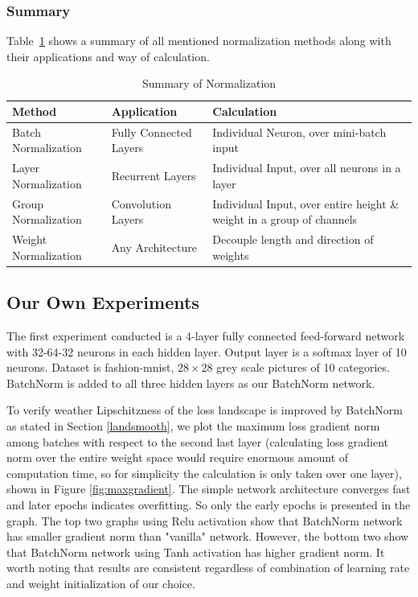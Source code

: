 \documentclass{article}
\begin{document}
\subsubsection{Summary}
Table~\ref{normsum} shows a summary of all mentioned normalization methods along with their applications and way of calculation.\\

\begingroup
\setlength{\tabcolsep}{10pt} %
\renewcommand{\arraystretch}{1.5} %
\begin{table}[h] 
\centering
 \begin{tabular}{|m{10em} | m{10em} | m{10em}|} 
 \hline
 Method & Application & Calculation\\  
 \hline
 Batch Normalization & Fully Connected Layers & Individual Neuron, over mini-batch input\\ [0.5ex] 
 \hline
 Layer Normalization & Recurrent Layers & Individual Input, over all neurons in a layer\\ [0.5ex]
 \hline
 Group Normalization & Convolution Layers & Individual Input, over entire height \& weight in a group of channels\\[0.5ex]
 \hline
 Weight Normalization & Any Architecture & Decouple length and direction of weights\\
 \hline
\end{tabular}
\caption{Summary of Normalization}
\label{normsum}
\end{table}
\endgroup

\subsection{Our Own Experiments}
The first experiment conducted is a 4-layer fully connected feed-forward network with 32-64-32 neurons in each hidden layer. Output layer is a softmax layer of 10 neurons. Dataset is fashion-mnist, $28\times28$ grey scale pictures of 10 categories. BatchNorm is added to all three hidden layers as our BatchNorm network.

To verify weather Lipschitzness of the loss landscape is improved by BatchNorm as stated in Section \ref{landsmooth}, we plot the maximum loss gradient norm among batches with respect to the second last layer (calculating loss gradient norm over the entire weight space would require enormous amount of computation time, so for simplicity the calculation is only taken over one layer), shown in Figure \ref{fig:maxgradient}. The simple network architecture converges fast and later epochs indicates overfitting. So only the early epochs is presented in the graph. The top two graphs using Relu activation show that BatchNorm network has smaller gradient norm than "vanilla" network. However, the bottom two show that BatchNorm network using Tanh activation has higher gradient norm. It worth noting that results are consistent regardless of combination of learning rate and weight initialization of our choice.
\end{document}
